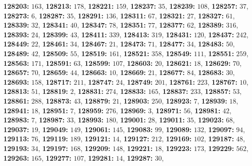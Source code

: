 \textsf{\bfseries 128203:} $163$, \textsf{\bfseries 128213:} $178$, \textsf{\bfseries 128221:} $159$, \textsf{\bfseries 128237:} $35$, \textsf{\bfseries 128239:} $108$, \textsf{\bfseries 128257:} $37$, \textsf{\bfseries 128273:} $6$, \textsf{\bfseries 128287:} $35$, \textsf{\bfseries 128291:} $136$, \textsf{\bfseries 128311:} $67$, \textsf{\bfseries 128321:} $27$, \textsf{\bfseries 128327:} $61$, \textsf{\bfseries 128339:} $32$, \textsf{\bfseries 128341:} $40$, \textsf{\bfseries 128347:} $78$, \textsf{\bfseries 128351:} $77$, \textsf{\bfseries 128377:} $62$, \textsf{\bfseries 128389:} $316$, \textsf{\bfseries 128393:} $24$, \textsf{\bfseries 128399:} $43$, \textsf{\bfseries 128411:} $339$, \textsf{\bfseries 128413:} $319$, \textsf{\bfseries 128431:} $120$, \textsf{\bfseries 128437:} $242$, \textsf{\bfseries 128449:} $22$, \textsf{\bfseries 128461:} $34$, \textsf{\bfseries 128467:} $21$, \textsf{\bfseries 128473:} $71$, \textsf{\bfseries 128477:} $34$, \textsf{\bfseries 128483:} $50$, \textsf{\bfseries 128489:} $42$, \textsf{\bfseries 128509:} $55$, \textsf{\bfseries 128519:} $161$, \textsf{\bfseries 128521:} $358$, \textsf{\bfseries 128549:} $111$, \textsf{\bfseries 128551:} $259$, \textsf{\bfseries 128563:} $171$, \textsf{\bfseries 128591:} $63$, \textsf{\bfseries 128599:} $107$, \textsf{\bfseries 128603:} $20$, \textsf{\bfseries 128621:} $18$, \textsf{\bfseries 128629:} $70$, \textsf{\bfseries 128657:} $70$, \textsf{\bfseries 128659:} $44$, \textsf{\bfseries 128663:} $10$, \textsf{\bfseries 128669:} $21$, \textsf{\bfseries 128677:} $84$, \textsf{\bfseries 128683:} $30$, \textsf{\bfseries 128693:} $158$, \textsf{\bfseries 128717:} $211$, \textsf{\bfseries 128747:} $24$, \textsf{\bfseries 128749:} $201$, \textsf{\bfseries 128761:} $223$, \textsf{\bfseries 128767:} $10$, \textsf{\bfseries 128813:} $51$, \textsf{\bfseries 128819:} $2$, \textsf{\bfseries 128831:} $274$, \textsf{\bfseries 128833:} $165$, \textsf{\bfseries 128837:} $233$, \textsf{\bfseries 128857:} $53$, \textsf{\bfseries 128861:} $288$, \textsf{\bfseries 128873:} $43$, \textsf{\bfseries 128879:} $21$, \textsf{\bfseries 128903:} $250$, \textsf{\bfseries 128923:} $7$, \textsf{\bfseries 128939:} $18$, \textsf{\bfseries 128941:} $18$, \textsf{\bfseries 128951:} $7$, \textsf{\bfseries 128959:} $276$, \textsf{\bfseries 128969:} $3$, \textsf{\bfseries 128971:} $56$, \textsf{\bfseries 128981:} $42$, \textsf{\bfseries 128983:} $7$, \textsf{\bfseries 128987:} $33$, \textsf{\bfseries 128993:} $180$, \textsf{\bfseries 129001:} $28$, \textsf{\bfseries 129011:} $35$, \textsf{\bfseries 129023:} $68$, \textsf{\bfseries 129037:} $19$, \textsf{\bfseries 129049:} $149$, \textsf{\bfseries 129061:} $145$, \textsf{\bfseries 129083:} $99$, \textsf{\bfseries 129089:} $132$, \textsf{\bfseries 129097:} $94$, \textsf{\bfseries 129113:} $76$, \textsf{\bfseries 129119:} $189$, \textsf{\bfseries 129121:} $14$, \textsf{\bfseries 129127:} $212$, \textsf{\bfseries 129169:} $102$, \textsf{\bfseries 129187:} $48$, \textsf{\bfseries 129193:} $34$, \textsf{\bfseries 129197:} $168$, \textsf{\bfseries 129209:} $148$, \textsf{\bfseries 129221:} $18$, \textsf{\bfseries 129223:} $173$, \textsf{\bfseries 129229:} $562$, \textsf{\bfseries 129263:} $165$, \textsf{\bfseries 129277:} $107$, \textsf{\bfseries 129281:} $14$, \textsf{\bfseries 129287:} $30$, 
